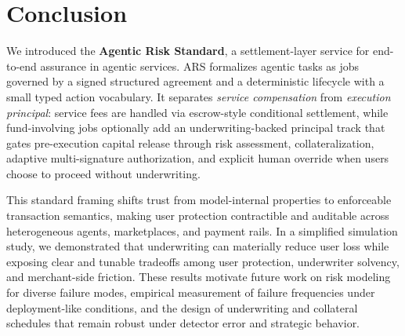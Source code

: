 \documentclass{article} %
\begin{document}
\section{Conclusion}
We introduced the \textbf{Agentic Risk Standard}, a settlement-layer service for end-to-end assurance in agentic services. ARS formalizes agentic tasks as jobs governed by a signed structured agreement and a deterministic lifecycle with a small typed action vocabulary. It separates \emph{service compensation} from \emph{execution principal}: service fees are handled via escrow-style conditional settlement, while fund-involving jobs optionally add an underwriting-backed principal track that gates pre-execution capital release through risk assessment, collateralization, adaptive multi-signature authorization, and explicit human override when users choose to proceed without underwriting.

This standard framing shifts trust from model-internal properties to enforceable transaction semantics, making user protection contractible and auditable across heterogeneous agents, marketplaces, and payment rails. In a simplified simulation study, we demonstrated that underwriting can materially reduce user loss while exposing clear and tunable tradeoffs among user protection, underwriter solvency, and merchant-side friction. These results motivate future work on risk modeling for diverse failure modes, empirical measurement of failure frequencies under deployment-like conditions, and the design of underwriting and collateral schedules that remain robust under detector error and strategic behavior.




\end{document}
